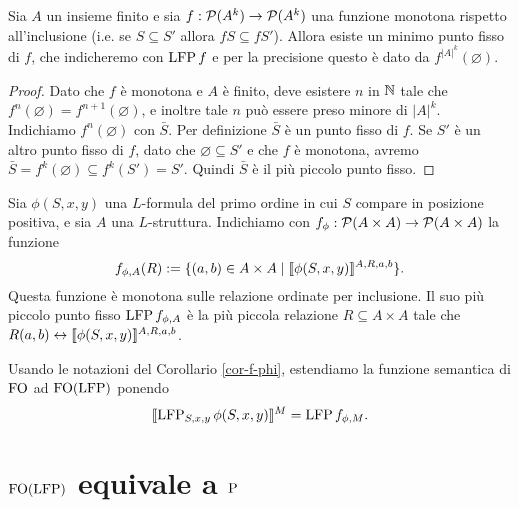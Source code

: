 \begin{teorema}
\label{teo-tarski-knaster}
 Sia $A$ un insieme finito e sia $f: \powerset(A^k) \to \powerset(A^k)$ una
 funzione monotona rispetto all'inclusione
 (i.e. se $S \subseteq S'$ allora $f S \subseteq f S'$). Allora esiste un minimo
 punto fisso di $f$, che indicheremo con $\LFP f$ e per la precisione
 questo è dato da $f^{|A|^k}(\varnothing)$.
\end{teorema}

\begin{proof}
 Dato che $f$ è monotona e $A$ è finito, deve esistere $n$ in $\N$ tale che
 $f^n(\varnothing) = f^{n+1}(\varnothing)$, e inoltre tale $n$ può essere preso
 minore di $|A|^k$. Indichiamo $f^n(\varnothing)$ con $\bar{S}$.
 Per definizione $\bar{S}$ è un punto fisso di $f$.
 Se $S'$ è un altro punto fisso di $f$, dato che $\varnothing \subseteq S'$ e
 che $f$ è monotona, avremo $\bar{S} = f^k(\varnothing) \subseteq f^k(S') = S'$.
 Quindi $\bar{S}$ è il più piccolo punto fisso.
\end{proof}



\begin{corollario}
\label{cor-f-phi}
 Sia $\phi(S,x,y)$ una $L$-formula del primo ordine in cui $S$ compare in posizione
 positiva, e sia $A$ una $L$-struttura.
 Indichiamo con $f_\phi: \powerset (A \times A) \to \powerset (A\times A)$ la funzione
 \[ f_{\phi,A}(R) := \{ (a,b) \in A \times A \mid \semantic{ \phi (S,x,y)}^{A,R,a,b} \}. \]
 Questa funzione è monotona sulle relazione ordinate per inclusione.
 Il suo più piccolo punto fisso $\LFP f_{\phi,A}$ è la più piccola relazione
 $R \subseteq A \times A$ tale che $R(a,b) \leftrightarrow \semantic{\phi(S,x,y)}^{A,R,a,b}$.
\end{corollario}

\begin{definizione}
 Usando le notazioni del Corollario \ref{cor-f-phi}, estendiamo la funzione
 semantica di $\FO$ ad $\FO(\LFP)$ ponendo
 \[\semantic{\LFP_{S,x,y} \phi(S,x,y)}^M = \LFP f_{\phi,M}.\]
\end{definizione}

\section{$\FO(\LFP)$ equivale a $\P$}

